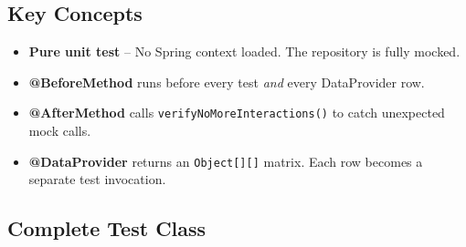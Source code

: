 \documentclass[12pt,a4paper]{article}
\begin{document}
\subsection{Key Concepts}
\begin{itemize}
    \item \textbf{Pure unit test} -- No Spring context loaded. The repository is fully mocked.
    \item \textbf{@BeforeMethod} runs before every test \textit{and} every DataProvider row.
    \item \textbf{@AfterMethod} calls \texttt{verifyNoMoreInteractions()} to catch unexpected mock calls.
    \item \textbf{@DataProvider} returns an \texttt{Object[][]} matrix. Each row becomes a separate test invocation.
\end{itemize}

\subsection{Complete Test Class}
\end{document}
